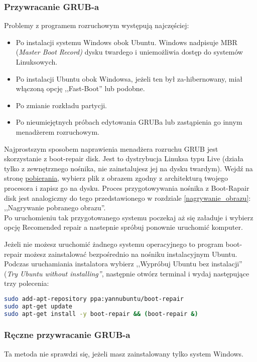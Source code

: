 \subsubsection{Przywracanie GRUB-a}
\label{grub_przywracanie}
Problemy z programem rozruchowym występują najczęściej:
\begin{itemize}
\item Po instalacji systemu Windows obok Ubuntu. Windows nadpisuje MBR (\textit{Master Boot Record)} dysku twardego i uniemożliwia dostęp do systemów Linuksowych.
\item Po instalacji Ubuntu obok Windowsa, jeżeli ten był za-hibernowany, miał włączoną opcję ,,Fast-Boot'' lub podobne.
\item Po zmianie rozkładu partycji.
\item Po nieumiejętnych próbach edytowania GRUBa lub zastąpienia go innym menadżerem rozruchowym.
\end{itemize}

Najprostszym sposobem naprawienia menadżera rozruchu GRUB jest skorzystanie z boot-repair disk. Jest to dystrybucja Linuksa typu Live (działa tylko z zewnętrznego nośnika, nie zainstalujesz jej na dysku twardym). Wejdź na stronę \href{http://sourceforge.net/projects/boot-repair-cd/files/}{pobierania}, wybierz plik z obrazem zgodny z architekturą twojego procesora i zapisz go na dysku. Proces przygotowywania nośnika z Boot-Rapair disk jest analogiczny do tego przedstawionego w rozdziale \ref{nagrywanie_obrazu}: ,,Nagrywanie pobranego obrazu''.\\
Po uruchomieniu tak przygotowanego systemu poczekaj aż się załaduje i wybierz opcję \textcolor{ubuntu_orange}{Recomended repair} a nastepnie spróbuj ponownie uruchomić komputer.

Jeżeli nie możesz uruchomić żadnego systemu operacyjnego to program boot-repair możesz zainstalować bezpośrednio na nośniku instalacyjnym Ubuntu. Podczas uruchamiania instalatora wybierz ,,Wypróbuj Ubuntu bez instalacji'' (\textit{Try Ubuntu without installing''}, następnie otwórz terminal  i wydaj następujące trzy polecenia:

\begin{lstlisting}[language=bash]
sudo add-apt-repository ppa:yannubuntu/boot-repair
sudo apt-get update
sudo apt-get install -y boot-repair && (boot-repair &)
\end{lstlisting}

\subsubsection{Ręczne przywracanie GRUB-a}
Ta metoda nie sprawdzi się, jeżeli masz zainstalowany tylko system Windows.


